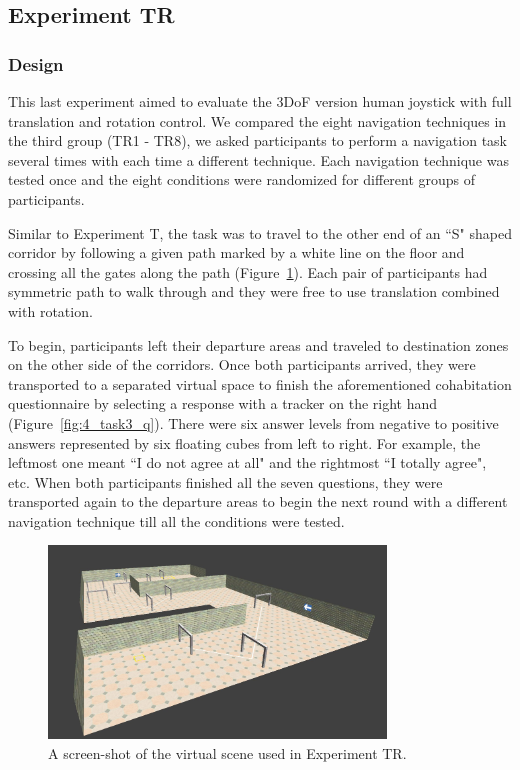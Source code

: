 \subsection{Experiment TR}

\subsubsection{Design}
This last experiment aimed to evaluate the 3DoF version human joystick with full translation and rotation control. We compared the eight navigation techniques in the third group (TR1 - TR8), we asked participants to perform a navigation task several times with each time a different technique. Each navigation technique was tested once and the eight conditions were randomized for different groups of participants.

Similar to Experiment T, the task was to travel to the other end of an ``S" shaped corridor by following a given path marked by a white line on the floor and crossing all the gates along the path (Figure~\ref{fig:4_task3}). Each pair of participants had symmetric path to walk through and they were free to use translation combined with rotation.

To begin, participants left their departure areas and traveled to destination zones on the other side of the corridors. Once both participants arrived, they were transported to a separated virtual space to finish the aforementioned cohabitation questionnaire by selecting a response with a tracker on the right hand (Figure~\ref{fig:4_task3_q}). There were six answer levels from negative to positive answers represented by six floating cubes from left to right. For example, the leftmost one meant ``I do not agree at all" and the rightmost ``I totally agree", etc.  When both participants finished all the seven questions, they were transported again to the departure areas to begin the next round with a different navigation technique till all the conditions were tested.

\begin{figure}[tb]
  \centering
  \includegraphics[width=0.8\textwidth]{figures/ch4/t3}
  \caption{\label{fig:4_task3}A screen-shot of the virtual scene used in Experiment TR.}
\end{figure}

